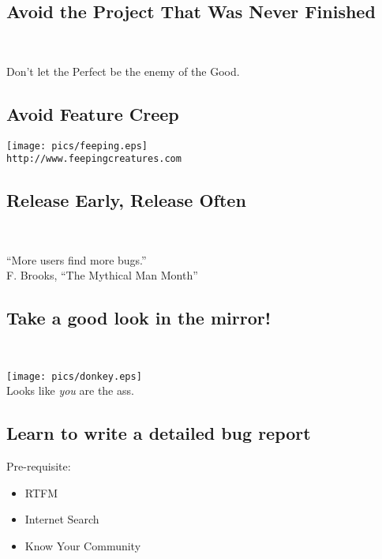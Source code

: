 \documentclass[xga]{xdvislides}
\begin{document}
\subsection{Avoid the Project That Was Never Finished}
\\
\Huge
\begin{center}
	Don't let the Perfect be the enemy of the Good.
\end{center}
\Normalsize

\subsection{Avoid Feature Creep}
\vspace*{\fill}
\begin{center}
	\texttt{[image: pics/feeping.eps]} \\
	\small
	\verb+http://www.feepingcreatures.com+
\end{center}
\vspace*{\fill}

\subsection{Release Early, Release Often}
\\
\Huge
\begin{center}
	``More users find more bugs.'' \\
	\addvspace{.2in}
	\small F. Brooks, ``The Mythical Man Month''
\end{center}
\Normalsize

\subsection{Take a good look in the mirror!}
\\
\vspace*{\fill}
\begin{center}
	\texttt{[image: pics/donkey.eps]} \\
	\small
	Looks like {\em you} are the ass.
\end{center}
\vspace*{\fill}

\subsection{Learn to write a detailed bug report}
Pre-requisite:
\begin{itemize}
	\item RTFM
	\item Internet Search
	\item Know Your Community
\end{itemize}
\end{document}
